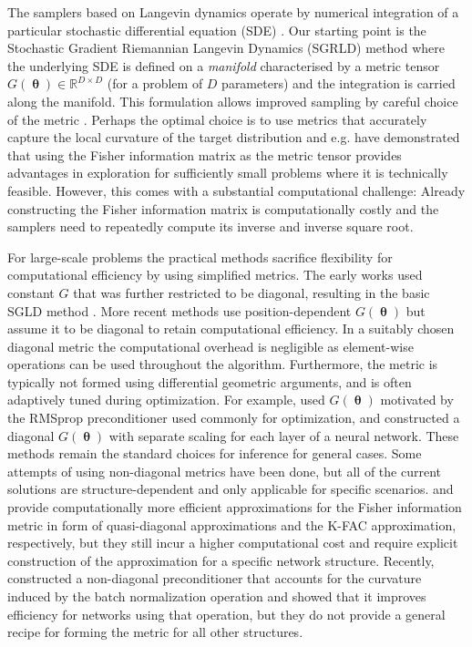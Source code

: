 \documentclass[10pt]{article} %
\DeclareMathOperator{\btheta}{\boldsymbol{\theta}}
\theoremstyle{plain}
\theoremstyle{definition}
\theoremstyle{remark}
\begin{document}
The samplers based on Langevin dynamics operate by numerical integration of a particular stochastic differential equation (SDE) \citep{Ma2015}. Our starting point is the Stochastic Gradient Riemannian Langevin Dynamics (SGRLD) method where the underlying SDE is defined on a \emph{manifold} characterised by a metric tensor $G(\btheta) \in \mathbb{R}^{D \times D}$ (for a problem of $D$ parameters) and the integration is carried along the manifold. This formulation allows improved sampling by careful choice of the metric \citep{Ma2015}. 
Perhaps the optimal choice is to use metrics that accurately capture the local curvature of the target distribution and e.g. \citet{Girolami2011} have demonstrated that using the Fisher information matrix as the metric tensor provides advantages in exploration for sufficiently small problems where it is technically feasible. However, this comes with a substantial computational challenge: Already constructing the Fisher information matrix is computationally costly and the samplers need to repeatedly compute its inverse and inverse square root. 

For large-scale problems the practical methods sacrifice flexibility for computational efficiency by using simplified metrics. The early works used constant $G$ that was further restricted to be diagonal, resulting in the basic SGLD method \citep{Welling2011}. More recent methods use position-dependent $G(\btheta)$ but assume it to be diagonal to retain computational efficiency. In a suitably chosen diagonal metric the computational overhead is negligible as element-wise operations can be used throughout the algorithm. Furthermore, the metric is typically not formed using differential geometric arguments, and is often adaptively tuned during optimization. For example, \citet{Li2016} used $G(\btheta)$ motivated by the RMSprop preconditioner used commonly for optimization, and \citet{Wenzel2020} constructed a diagonal $G(\btheta)$ with separate scaling for each layer of a neural network. These methods remain the standard choices for inference for general cases. Some attempts of using non-diagonal metrics have been done, but all of the current solutions are structure-dependent and only applicable for specific scenarios. \citet{Caron2017} and \citet{Nado2018} provide computationally more efficient approximations for the Fisher information metric in form of quasi-diagonal approximations and the K-FAC approximation, respectively, but they still incur a higher computational cost and require explicit construction of the approximation for a specific network structure. Recently, \citet{Lange2023} constructed a non-diagonal preconditioner that accounts for the curvature induced by the batch normalization operation and showed that it improves efficiency for networks using that operation, but they do not provide a general recipe for forming the metric for all other structures.
\end{document}
